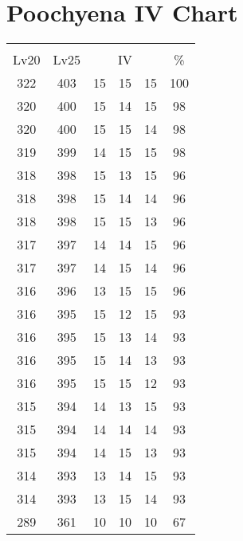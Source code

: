 \documentclass{article}%
\begin{document}
%
\normalsize%
\section{Poochyena IV Chart}%
\label{sec:Poochyena IV Chart}%
\renewcommand{\arraystretch}{1.5}%
\begin{tabular}{|c|c|c|c|c|c|}%
\hline%
\multicolumn{6}{|c|}{\textcolor{white}{ 
\linebreak{Poochyena}
}%
\cellcolor{black}}\\%
\multicolumn{1}{|c}{Lv20}&\multicolumn{1}{c|}{Lv25}&\multicolumn{3}{c|}{IV}&\multicolumn{1}{|c|}{\%}\\%
\hline%
\rowcolor{color100}%
322&403&15&15&15&100\\%
\hline%
\rowcolor{color98}%
320&400&15&14&15&98\\%
\hline%
\rowcolor{color98}%
320&400&15&15&14&98\\%
\hline%
\rowcolor{color98}%
319&399&14&15&15&98\\%
\hline%
\rowcolor{color96}%
318&398&15&13&15&96\\%
\hline%
\rowcolor{color96}%
318&398&15&14&14&96\\%
\hline%
\rowcolor{color96}%
318&398&15&15&13&96\\%
\hline%
\rowcolor{color96}%
317&397&14&14&15&96\\%
\hline%
\rowcolor{color96}%
317&397&14&15&14&96\\%
\hline%
\rowcolor{color96}%
316&396&13&15&15&96\\%
\hline%
\rowcolor{color93}%
316&395&15&12&15&93\\%
\hline%
\rowcolor{color93}%
316&395&15&13&14&93\\%
\hline%
\rowcolor{color93}%
316&395&15&14&13&93\\%
\hline%
\rowcolor{color93}%
316&395&15&15&12&93\\%
\hline%
\rowcolor{color93}%
315&394&14&13&15&93\\%
\hline%
\rowcolor{color93}%
315&394&14&14&14&93\\%
\hline%
\rowcolor{color93}%
315&394&14&15&13&93\\%
\hline%
\rowcolor{color93}%
314&393&13&14&15&93\\%
\hline%
\rowcolor{color93}%
314&393&13&15&14&93\\%
\hline%
\rowcolor{color91}%
289&361&10&10&10&67\\%
\end{tabular}

%
\end{document}
